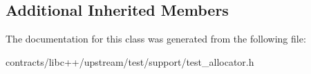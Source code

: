 \subsection*{Additional Inherited Members}


The documentation for this class was generated from the following file\+:\begin{DoxyCompactItemize}
\item 
contracts/libc++/upstream/test/support/test\+\_\+allocator.\+h\end{DoxyCompactItemize}
